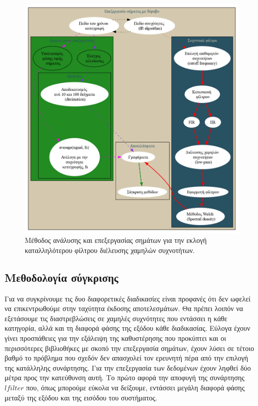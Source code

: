 \documentclass[breaklines=true, 12pt]{article}
\begin{document}
\begin{figure}[htbp]
\centering
\includegraphics[width=.9\linewidth]{./flowcharts/proc-meth.png}
\caption{Μέθοδος ανάλυσης και επεξεργασίας σημάτων για την εκλογή καταλληλότερου φίλτρου διέλευσης χαμηλών συχνοτήτων.}
\end{figure}

\clearpage
\subsection{Μεθοδολογία σύγκρισης}
\label{sec:orgf3ce85b}
Για να συγκρίνουμε τις δυο διαφορετικές διαδικασίες είναι προφανές ότι δεν
ωφελεί να επικεντρωθούμε στην ταχύτητα έκδοσης αποτελεσμάτων. Θα πρέπει λοιπόν
να εξετάσουμε τις διαστρεβλώσεις σε χαμηλές συχνότητες που εντάσσει η κάθε
κατηγορία, αλλά και τη διαφορά φάσης της εξόδου κάθε διαδικασίας. Εύλογα έχουν
γίνει προσπάθειες για την εξάλειψη της καθυστέρησης που προκύπτει και οι
περισσότερες βιβλιοθήκες με σκοπό την επεξεργασία σημάτων, έχουν λύσει σε
τέτοιο βαθμό το πρόβλημα που σχεδόν δεν απασχολεί τον ερευνητή πέρα από την
επιλογή της κατάλληλης συνάρτησης. Για την επεξεργασία των δεδομένων έχουν ληφθεί
δύο μέτρα προς την κατεύθυνση αυτή. Το πρώτο αφορά την αποφυγή της συνάρτησης
\(lfilter\) που, όπως μπορούμε εύκολα να δείξουμε, εντάσσει μεγάλη διαφορά φάσης
μεταξύ της εξόδου και της εισόδου του συστήματος.
\end{document}
